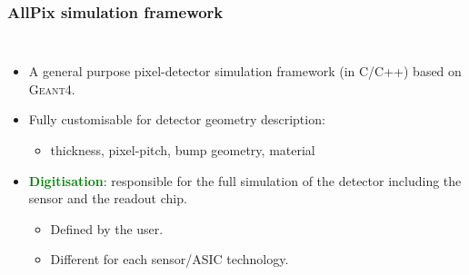 \begin{frame}
  \frametitle{AllPix simulation framework}

  \begin{columns}

    \begin{itemize}
    \item A general purpose pixel-detector simulation framework (in
      C/C++) based on \textsc{Geant4}.
    \item Fully customisable for detector geometry description:
      \begin{itemize}
      \item thickness, pixel-pitch, bump geometry, material
      \end{itemize}
    \item \textcolor{Green}{\textbf{Digitisation}}: responsible for the
      full simulation of the detector including the sensor and the
      readout chip. 
      \begin{itemize}
      \item Defined by the user.
      \item Different for each sensor/ASIC technology.
      \end{itemize}
    \end{itemize}
    
    \centering


\end{columns}
\end{frame}
